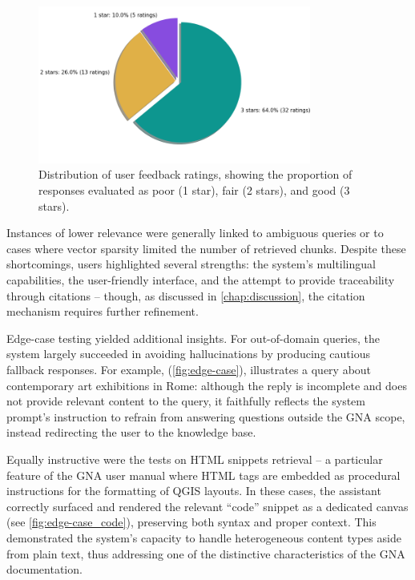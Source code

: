 \begin{spacing}{1.5}
\vspace{0.9em}
\begin{figure}[H]
  \centering
  \includegraphics[width=0.8\textwidth]{images/rating_proportions.png} 
  \caption{Distribution of user feedback ratings, showing the proportion of responses evaluated as poor (1 star), fair (2 stars), and good (3 stars).}
  \label{fig:ratings_}
\end{figure}

Instances of lower relevance were generally linked to ambiguous queries or to cases where vector sparsity limited the number of retrieved chunks. Despite these shortcomings, users highlighted several strengths: the system’s multilingual capabilities, the user-friendly interface, and the attempt to provide traceability through citations -- though, as discussed in \autoref{chap:discussion}, the citation mechanism requires further refinement.

Edge-case testing yielded additional insights. For out-of-domain queries, the system largely succeeded in avoiding hallucinations by producing cautious fallback responses. For example, (\autoref{fig:edge-case}), illustrates a query about contemporary art exhibitions in Rome: although the reply is incomplete and does not provide relevant content to the query, it faithfully reflects the system prompt’s instruction to refrain from answering questions outside the GNA scope, instead redirecting the user to the knowledge base.

Equally instructive were the tests on HTML snippets retrieval -- a particular feature of the GNA user manual where HTML tags are embedded as procedural instructions for the formatting of QGIS layouts. In these cases, the assistant correctly surfaced and rendered the relevant ``code'' snippet as a dedicated canvas (see \autoref{fig:edge-case_code}), preserving both syntax and proper context. This demonstrated the system’s capacity to handle heterogeneous content types aside from plain text, thus addressing one of the distinctive characteristics of the GNA documentation.\\


\end{spacing}
